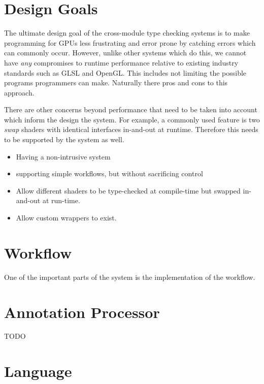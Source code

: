 \documentclass[a4paper,12pt,twoside,openright]{report}
\begin{document}
\section{Design Goals}

The ultimate design goal of the cross-module type checking systems is to make
programming for GPUs less frustrating and error prone by catching errors which
can commonly occur. However, unlike other systems which do this, we cannot have
\textit{any} compromises to runtime performance relative to existing industry
standards such as GLSL and OpenGL. This includes not limiting the possible
programs programmers can make. Naturally there pros and cons to this approach.

There are other concerns beyond performance that need to be taken into account
which inform the design the system. For example, a commonly used feature is two
\textit{swap} shaders with identical interfaces in-and-out at runtime.
Therefore this needs to be supported by the system as well.

\begin{itemize}

    \item Having a non-intrusive system

    \item supporting simple workflows, but without sacrificing control

    \item Allow different shaders to be type-checked at compile-time but
    swapped in-and-out at run-time.

    \item Allow custom wrappers to exist.

\end{itemize}

\section{Workflow}

One of the important parts of the system is the implementation of the workflow.

\section{Annotation Processor}

TODO

\section{Language}
\end{document}
